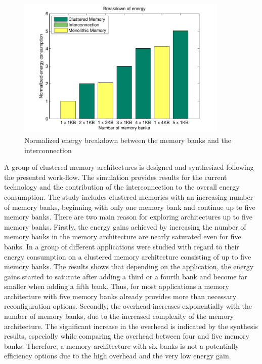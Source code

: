 \begin{figure}
 \centering
 \includegraphics[width = 0.9\textwidth]{E/energy2.pdf}
  \caption{Normalized energy breakdown between the memory banks and the interconnection}
 \label{fig:energyE}
 \end{figure}

A group of clustered memory architectures is designed and synthesized following the presented work-flow.
The simulation provides results for the current technology and the contribution of the interconnection to the overall energy consumption.
The study includes clustered memories with an increasing number of memory banks, beginning with only one memory bank and continue up to five memory banks.
There are two main reason for exploring architectures up to five memory banks.
Firstly, the energy gains achieved by increasing the number of memory banks in the memory architecture are nearly saturated even for five banks.
In \cite{filippopoulos2013exploration} a group of different applications were studied with regard to their energy consumption on a clustered memory architecture consisting of up to five memory banks.
The results shows that depending on the application, the energy gains started to saturate after adding a third or a fourth bank and become far smaller when adding a fifth bank.
Thus, for most applications a memory architecture with five memory banks already provides more than necessary reconfiguration options.  
Secondly, the overhead increases exponentially with the number of memory banks, due to the increased complexity of the memory architecture. 
The significant increase in the overhead is indicated by the synthesis results, especially while comparing the overhead between four and five memory banks.
Therefore, a memory architecture with six banks is not a potentially efficiency options due to the high overhead and the very low energy gain.


